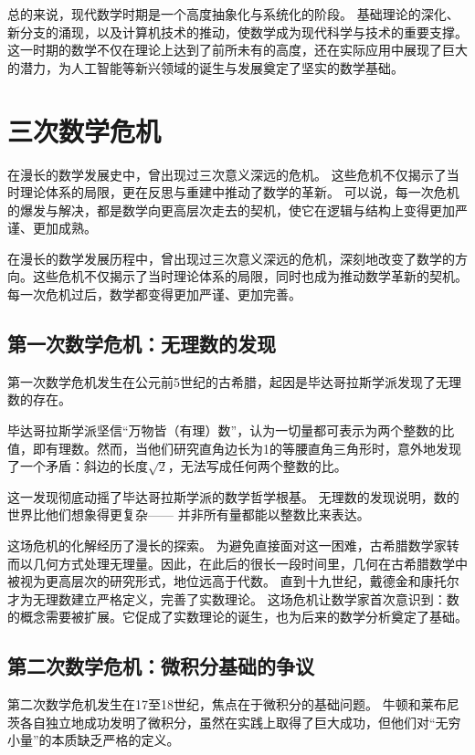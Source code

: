 总的来说，现代数学时期是一个高度抽象化与系统化的阶段。  
基础理论的深化、新分支的涌现，以及计算机技术的推动，使数学成为现代科学与技术的重要支撑。  
这一时期的数学不仅在理论上达到了前所未有的高度，还在实际应用中展现了巨大的潜力，为人工智能等新兴领域的诞生与发展奠定了坚实的数学基础。


\section{三次数学危机}


在漫长的数学发展史中，曾出现过三次意义深远的危机。  
这些危机不仅揭示了当时理论体系的局限，更在反思与重建中推动了数学的革新。  
可以说，每一次危机的爆发与解决，都是数学向更高层次走去的契机，使它在逻辑与结构上变得更加严谨、更加成熟。

在漫长的数学发展历程中，曾出现过三次意义深远的危机，深刻地改变了数学的方向。这些危机不仅揭示了当时理论体系的局限，同时也成为推动数学革新的契机。每一次危机过后，数学都变得更加严谨、更加完善。



\subsection{第一次数学危机：无理数的发现}


第一次数学危机发生在公元前5世纪的古希腊，起因是毕达哥拉斯学派发现了无理数的存在。

毕达哥拉斯学派坚信“万物皆（有理）数”，认为一切量都可表示为两个整数的比值，即有理数。然而，当他们研究直角边长为1的等腰直角三角形时，意外地发现了一个矛盾：斜边的长度$\sqrt{2}$，无法写成任何两个整数的比。  


这一发现彻底动摇了毕达哥拉斯学派的数学哲学根基。  
无理数的发现说明，数的世界比他们想象得更复杂——  
并非所有量都能以整数比来表达。

这场危机的化解经历了漫长的探索。  
为避免直接面对这一困难，古希腊数学家转而以几何方式处理无理量。因此，在此后的很长一段时间里，几何在古希腊数学中被视为更高层次的研究形式，地位远高于代数。
直到十九世纪，戴德金和康托尔才为无理数建立严格定义，完善了实数理论。
这场危机让数学家首次意识到：数的概念需要被扩展。它促成了实数理论的诞生，也为后来的数学分析奠定了基础。

\subsection{第二次数学危机：微积分基础的争议}

第二次数学危机发生在17至18世纪，焦点在于微积分的基础问题。
牛顿和莱布尼茨各自独立地成功发明了微积分，虽然在实践上取得了巨大成功，但他们对“无穷小量”的本质缺乏严格的定义。

